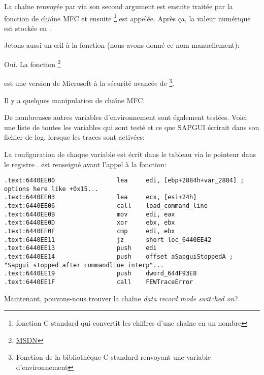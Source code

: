 
La chaîne renvoyée par  via son second argument est ensuite traitée
par la fonction de chaîne MFC et ensuite \footnote{fonction C standard
qui convertit les chiffres d'une chaîne en un nombre} est appelée.
Après ça, la valeur numérique est stockée en .

Jetons aussi un \oe{}il à la fonction  (nous avons donné ce nom manuellement):



Oui. La fonction \footnote{\href{http://go.yurichev.com/17250}{MSDN}}

est une version de Microsoft à la sécurité avancée de \footnote{Fonction
de la bibliothèque C standard renvoyant une variable d'environnement}.


Il y a quelques manipulation de chaîne MFC.

De nombreuses autres variables d'environnement sont également testées.
Voici une liste de toutes les variables qui sont testé et ce que SAPGUI écrirait
dans son fichier de log, lorsque les traces sont activées:



La configuration de chaque variable est écrit dans le tableau via le pointeur dans
le registre \EDI. \EDI est renseigné avant l'appel à la fonction:

\begin{lstlisting}[style=customasmx86]
.text:6440EE00                 lea     edi, [ebp+2884h+var_2884] ; options here like +0x15...
.text:6440EE03                 lea     ecx, [esi+24h]
.text:6440EE06                 call    load_command_line
.text:6440EE0B                 mov     edi, eax
.text:6440EE0D                 xor     ebx, ebx
.text:6440EE0F                 cmp     edi, ebx
.text:6440EE11                 jz      short loc_6440EE42
.text:6440EE13                 push    edi
.text:6440EE14                 push    offset aSapguiStoppedA ; "Sapgui stopped after commandline interp"...
.text:6440EE19                 push    dword_644F93E8
.text:6440EE1F                 call    FEWTraceError
\end{lstlisting}

Maintenant, pouvons-nous trouver la chaîne \emph{data record mode switched on}?

